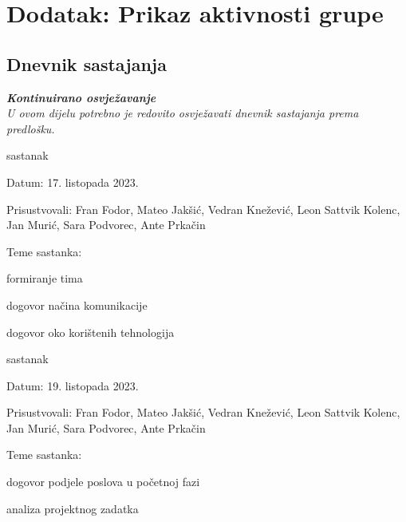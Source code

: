 \chapter*{Dodatak: Prikaz aktivnosti grupe}
		
		\section*{Dnevnik sastajanja}
		
		\textbf{\textit{Kontinuirano osvježavanje}}\\
		
		 \textit{U ovom dijelu potrebno je redovito osvježavati dnevnik sastajanja prema predlošku.}
		
		\begin{packed_enum}
			\item  sastanak
			\item[] \begin{packed_item}
				\item Datum: {17. listopada 2023.}
				\item Prisustvovali: {Fran Fodor, Mateo Jakšić, Vedran Knežević, Leon Sattvik Kolenc, Jan Murić, Sara Podvorec, Ante Prkačin}
				\item Teme sastanka:
				\begin{packed_item}
					\item  formiranje tima
					\item  dogovor načina komunikacije  
					\item  dogovor oko korištenih tehnologija
				\end{packed_item}
			\end{packed_item}
			
			\item  sastanak
			\item[] \begin{packed_item}
				\item Datum: {19. listopada 2023.}
				\item Prisustvovali: {Fran Fodor, Mateo Jakšić, Vedran Knežević, Leon Sattvik Kolenc, Jan Murić, Sara Podvorec, Ante Prkačin}
				\item Teme sastanka:
				\begin{packed_item}
					\item  dogovor podjele poslova u početnoj fazi
					\item  analiza projektnog zadatka
				\end{packed_item}
			\end{packed_item}


\end{packed_enum}
